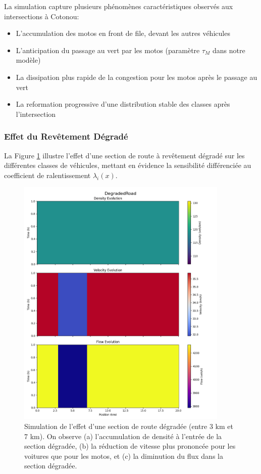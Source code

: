 La simulation capture plusieurs phénomènes caractéristiques observés aux intersections à Cotonou:
\begin{itemize}
    \item L'accumulation des motos en front de file, devant les autres véhicules
    \item L'anticipation du passage au vert par les motos (paramètre $\tau_M$ dans notre modèle)
    \item La dissipation plus rapide de la congestion pour les motos après le passage au vert
    \item La reformation progressive d'une distribution stable des classes après l'intersection
\end{itemize}

\subsubsection{Effet du Revêtement Dégradé}
\label{subsubsec:revetement_degrade}

La Figure \ref{fig:revetement_degrade} illustre l'effet d'une section de route à revêtement dégradé sur les différentes classes de véhicules, mettant en évidence la sensibilité différenciée au coefficient de ralentissement $\lambda_i(x)$.

\begin{figure}[htbp]
\centering
\includegraphics[width=0.9\textwidth]{simulations/MULTICLASS/degraded/degradedroad.png}
\caption{Simulation de l'effet d'une section de route dégradée (entre 3 km et 7 km). On observe (a) l'accumulation de densité à l'entrée de la section dégradée, (b) la réduction de vitesse plus prononcée pour les voitures que pour les motos, et (c) la diminution du flux dans la section dégradée.}
\label{fig:revetement_degrade}
\end{figure}

